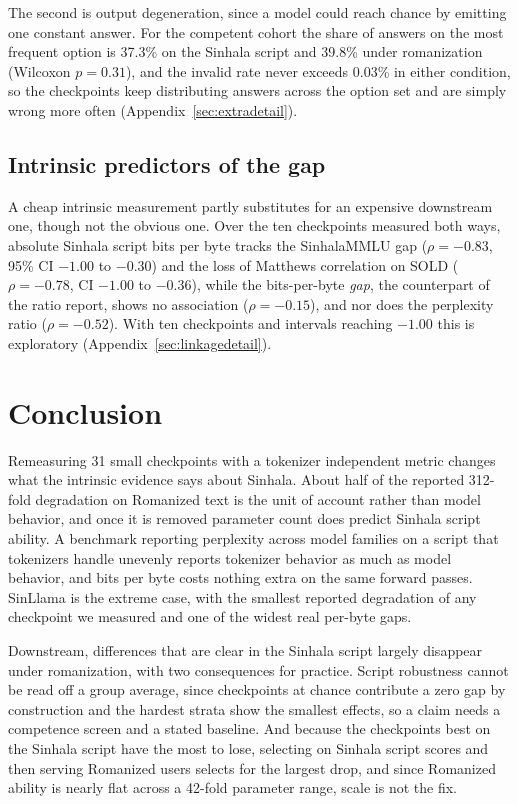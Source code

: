 \documentclass[11pt]{article}
\begin{document}
The second is output degeneration, since a model could reach chance by emitting one
constant answer. For the competent cohort the share of answers on the most frequent option
is 37.3\% on the Sinhala script and 39.8\% under romanization (Wilcoxon $p = 0.31$), and
the invalid rate never exceeds 0.03\% in either condition, so the checkpoints keep
distributing answers across the option set and are simply wrong more often
(Appendix~\ref{sec:extradetail}).

\subsection{Intrinsic predictors of the gap}
\label{sec:linkage}

A cheap intrinsic measurement partly substitutes for an expensive downstream one, though
not the obvious one. Over the ten checkpoints measured both ways, absolute Sinhala script
bits per byte tracks the SinhalaMMLU gap ($\rho = -0.83$, 95\% CI $-1.00$ to $-0.30$) and
the loss of Matthews correlation on SOLD ($\rho = -0.78$, CI $-1.00$ to $-0.36$), while
the bits-per-byte \emph{gap}, the counterpart of the ratio
\citet{rajapakse-weerasinghe-2026-script} report, shows no association ($\rho = -0.15$),
and nor does the perplexity ratio ($\rho = -0.52$). With ten checkpoints and intervals
reaching $-1.00$ this is exploratory (Appendix~\ref{sec:linkagedetail}).


\section{Conclusion}
\label{sec:conclusion}

Remeasuring 31 small checkpoints with a tokenizer independent metric changes what the
intrinsic evidence says about Sinhala. About half of the reported 312-fold degradation on
Romanized text is the unit of account rather than model behavior, and once it is removed
parameter count does predict Sinhala script ability. A benchmark reporting perplexity
across model families on a script that tokenizers handle unevenly reports tokenizer
behavior as much as model behavior, and bits per byte costs nothing extra on the same
forward passes. SinLlama is the extreme case, with the smallest reported degradation of
any checkpoint we measured and one of the widest real per-byte gaps.

Downstream, differences that are clear in the Sinhala script largely disappear under
romanization, with two consequences for practice. Script robustness cannot be read off a
group average, since checkpoints at chance contribute a zero gap by construction and the
hardest strata show the smallest effects, so a claim needs a competence screen and a
stated baseline. And because the checkpoints best on the Sinhala script have the most to
lose, selecting on Sinhala script scores and then serving Romanized users selects for the
largest drop, and since Romanized ability is nearly flat across a 42-fold parameter range,
scale is not the fix.
\end{document}
